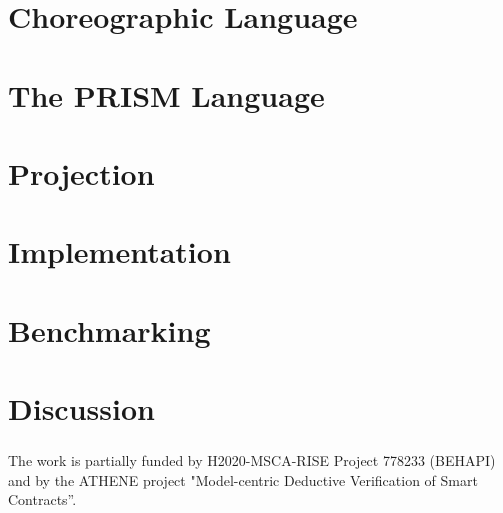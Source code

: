 \documentclass[runningheads]{llncs}
\begin{document}
\section{Choreographic Language}\label{sec:chor}


\section{The PRISM Language}\label{sec:prism}


\section{Projection}\label{sec:proj}


\section{Implementation}

\section{Benchmarking}


\section{Discussion}


\begin{credits}
    \subsubsection{\ackname} The work is partially funded by H2020-MSCA-RISE Project 778233 (BEHAPI) and by the ATHENE project "Model-centric Deductive Verification of Smart Contracts”.
\end{credits}



% 
\end{document}
